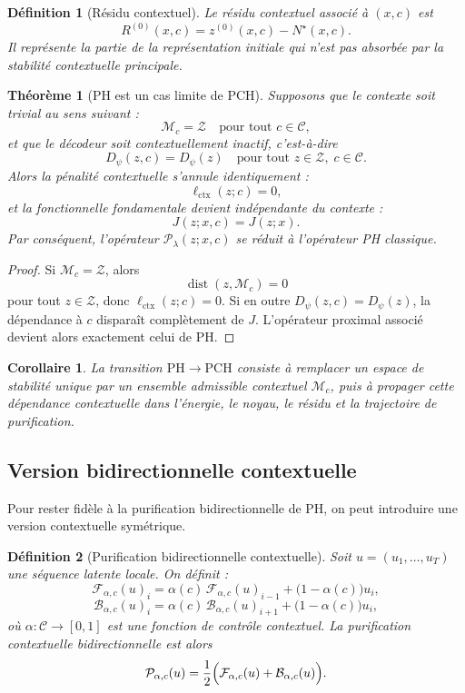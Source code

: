 \documentclass[11pt,a4paper]{article}
\newtheorem{definition}{Définition}[section]
\newtheorem{theorem}{Théorème}[section]
\newtheorem{corollary}{Corollaire}[section]
\DeclareMathOperator{\dist}{dist}
\newcommand{\C}{\mathcal C}
\newcommand{\Z}{\mathcal Z}
\newcommand{\Pcal}{\mathcal P}
\newcommand{\1}{\mathbf 1}
\begin{document}
\begin{definition}[Résidu contextuel]
Le résidu contextuel associé à \((x,c)\) est
\[
R^{(0)}(x,c)=z^{(0)}(x,c)-N^\star(x,c).
\]
Il représente la partie de la représentation initiale qui n'est pas absorbée par la stabilité contextuelle principale.
\end{definition}

\begin{theorem}[PH est un cas limite de PCH]
Supposons que le contexte soit trivial au sens suivant :
\[
\mathcal M_c = \Z
\quad\text{pour tout } c\in\C,
\]
et que le décodeur soit contextuellement inactif, c'est-à-dire
\[
D_\psi(z,c)=D_\psi(z)
\quad\text{pour tout } z\in\Z,\; c\in\C.
\]
Alors la pénalité contextuelle s'annule identiquement :
\[
\ell_{\mathrm{ctx}}(z;c)=0,
\]
et la fonctionnelle fondamentale devient indépendante du contexte :
\[
J(z;x,c)=J(z;x).
\]
Par conséquent, l'opérateur \(\Pcal_{\lambda}(z;x,c)\) se réduit à l'opérateur PH classique.
\end{theorem}

\begin{proof}
Si \(\mathcal M_c=\Z\), alors
\[
\dist(z,\mathcal M_c)=0
\]
pour tout \(z\in\Z\), donc \(\ell_{\mathrm{ctx}}(z;c)=0\).
Si en outre \(D_\psi(z,c)=D_\psi(z)\), la dépendance à \(c\) disparaît complètement de \(J\).
L'opérateur proximal associé devient alors exactement celui de PH.
\end{proof}

\begin{corollary}
La transition \(\mathrm{PH}\to\mathrm{PCH}\) consiste à remplacer un espace de stabilité unique par un ensemble admissible contextuel \(\mathcal M_c\), puis à propager cette dépendance contextuelle dans l'énergie, le noyau, le résidu et la trajectoire de purification.
\end{corollary}

\subsection{Version bidirectionnelle contextuelle}

Pour rester fidèle à la purification bidirectionnelle de PH, on peut introduire une version contextuelle symétrique.

\begin{definition}[Purification bidirectionnelle contextuelle]
Soit \(u=(u_1,\dots,u_T)\) une séquence latente locale.
On définit :
\[
\mathcal F_{\alpha,c}(u)_i
=
\alpha(c)\,\mathcal F_{\alpha,c}(u)_{i-1}
+
\bigl(1-\alpha(c)\bigr)u_i,
\]
\[
\mathcal B_{\alpha,c}(u)_i
=
\alpha(c)\,\mathcal B_{\alpha,c}(u)_{i+1}
+
\bigl(1-\alpha(c)\bigr)u_i,
\]
où \(\alpha:\C\to[0,1]\) est une fonction de contrôle contextuel.
La purification contextuelle bidirectionnelle est alors
\[
\Pcal_{\alpha,c}(u)
=
\frac12\Bigl(\mathcal F_{\alpha,c}(u)+\mathcal B_{\alpha,c}(u)\Bigr).
\]
\end{definition}
\end{document}

